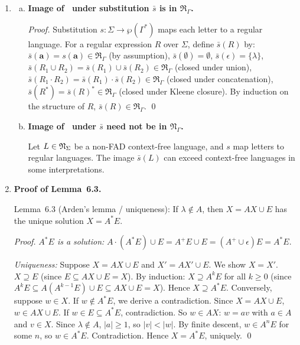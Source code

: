 \begin{enumerate}[{6.}1.]
\begin{proof}
Let $w\in A\cdot E$.  Then $w=xy$ with $x\in A$ and $y\in E$.  Since $E\subseteq Y$, $y\in Y$.  Hence $w=xy\in A\cdot Y$. \qed
\end{proof}

\item \begin{enumerate}[(a)]
  \item \textbf{Image of \RSIG\ under substitution $\bar{s}$ is in $\mathfrak{R}_\Gamma$.}

  \begin{proof}
  Substitution $s:\Sigma\to\wp(\Gamma^*)$ maps each letter to a regular language.  For a regular expression $R$ over $\Sigma$, define $\bar{s}(R)$ by:
  $\bar{s}(\pmb{a})=s(\pmb{a})\in\mathfrak{R}_\Gamma$ (by assumption),
  $\bar{s}(\emptyset)=\emptyset$, $\bar{s}(\epsilon)=\{\lambda\}$,
  $\bar{s}(R_1\cup R_2)=\bar{s}(R_1)\cup\bar{s}(R_2)\in\mathfrak{R}_\Gamma$ (closed under union),
  $\bar{s}(R_1\cdot R_2)=\bar{s}(R_1)\cdot\bar{s}(R_2)\in\mathfrak{R}_\Gamma$ (closed under concatenation),
  $\bar{s}(R^*)=\bar{s}(R)^*\in\mathfrak{R}_\Gamma$ (closed under Kleene closure).
  By induction on the structure of $R$, $\bar{s}(R)\in\mathfrak{R}_\Gamma$. \qed
  \end{proof}

  \item \textbf{Image of \NSIG\ under $\bar{s}$ need not be in $\mathfrak{N}_\Gamma$.}

  Let $L\in\mathfrak{N}_\Sigma$ be a non-FAD context-free language, and $s$ map letters to regular languages.  The image $\bar{s}(L)$ can exceed context-free languages in some interpretations.
\end{enumerate}

\item \textbf{Proof of Lemma~6.3.}

Lemma~6.3 (Arden's lemma / uniqueness): If $\lambda\notin A$, then $X=AX\cup E$ has the unique solution $X=A^*E$.

\begin{proof}
\emph{$A^*E$ is a solution:}  $A\cdot(A^*E)\cup E=A^+E\cup E=(A^+\cup\epsilon)E=A^*E$.  \checkmark

\emph{Uniqueness:}  Suppose $X=AX\cup E$ and $X'=AX'\cup E$.  We show $X=X'$.
$X\supseteq E$ (since $E\subseteq AX\cup E=X$).  By induction: $X\supseteq A^kE$ for all $k\ge 0$ (since $A^kE\subseteq A(A^{k-1}E)\cup E\subseteq AX\cup E=X$).  Hence $X\supseteq A^*E$.
Conversely, suppose $w\in X$.  If $w\notin A^*E$, we derive a contradiction.  Since $X=AX\cup E$, $w\in AX\cup E$.  If $w\in E\subseteq A^*E$, contradiction.  So $w\in AX$: $w=av$ with $a\in A$ and $v\in X$.  Since $\lambda\notin A$, $|a|\ge 1$, so $|v|<|w|$.  By finite descent, $w\in A^nE$ for some $n$, so $w\in A^*E$.  Contradiction.  Hence $X=A^*E$, uniquely. \qed
\end{proof}


\end{enumerate}
